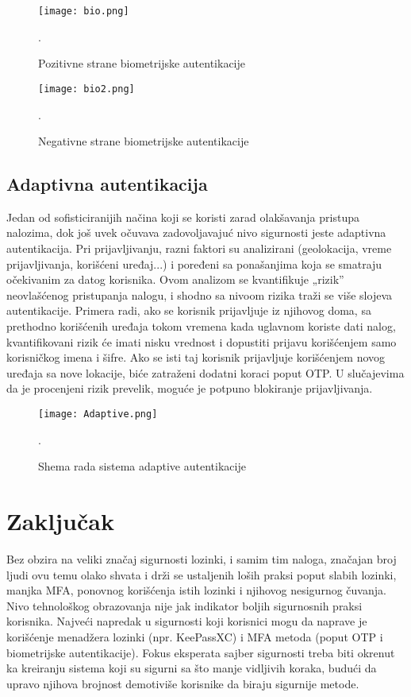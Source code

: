 \documentclass[fleqn, 12pt]{article}
\begin{document}
\begin{figure}[H]
    \centering
    \texttt{[image: bio.png]}
    \caption{Pozitivne strane biometrijske autentikacije\cite{bio}}.
    \label{fig:enter-label}
\end{figure}

\begin{figure}[H]
    \centering
    \texttt{[image: bio2.png]}
    \caption{Negativne strane biometrijske autentikacije\cite{bio}}.
    \label{fig:enter-label}
\end{figure}

\subsection{Adaptivna autentikacija}
\indent Jedan od sofisticiranijih načina koji se koristi zarad olakšavanja pristupa nalozima, dok još uvek očuvava zadovoljavajuć nivo sigurnosti jeste adaptivna autentikacija. Pri prijavljivanju, razni faktori su analizirani (geolokacija, vreme prijavljivanja, korišćeni uređaj...) i poređeni sa ponašanjima koja se smatraju očekivanim za datog korisnika. Ovom analizom se kvantifikuje „rizik'' neovlašćenog pristupanja nalogu, i shodno sa nivoom rizika traži se više slojeva autentikacije. Primera radi, ako se korisnik prijavljuje iz njihovog doma, sa prethodno korišćenih uređaja tokom vremena kada uglavnom koriste dati nalog, kvantifikovani rizik će imati nisku vrednost i dopustiti prijavu korišćenjem samo korisničkog imena i šifre. Ako se isti taj korisnik prijavljuje korišćenjem novog uređaja sa nove lokacije, biće zatraženi dodatni koraci poput OTP. U slučajevima da je procenjeni rizik prevelik, moguće je potpuno blokiranje prijavljivanja\cite{adaptive}. 

\begin{figure}[H]
    \centering
    \texttt{[image: Adaptive.png]}
    \caption{Shema rada sistema adaptive autentikacije\cite{adaptive}}.
    \label{fig:enter-label}
\end{figure}

\newpage
\section{Zaključak}
\indent Bez obzira na veliki značaj sigurnosti lozinki, i samim tim naloga, značajan broj ljudi ovu temu olako shvata i drži se ustaljenih loših praksi poput slabih lozinki, manjka MFA, ponovnog korišćenja istih lozinki i njihovog nesigurnog čuvanja. Nivo tehnološkog obrazovanja nije jak indikator boljih sigurnosnih praksi korisnika. Najveći napredak u sigurnosti koji korisnici mogu da naprave je korišćenje menadžera lozinki (npr. KeePassXC) i MFA metoda (poput OTP i biometrijske autentikacije). Fokus eksperata sajber sigurnosti treba biti okrenut ka kreiranju sistema koji su sigurni sa što manje vidljivih koraka, budući da upravo njihova brojnost demotiviše korisnike da biraju sigurnije metode. 

\end{document}
